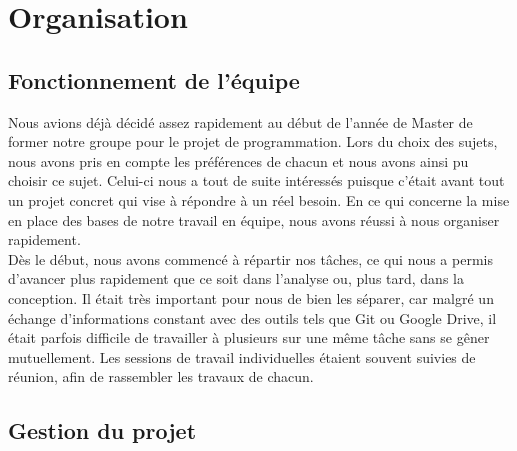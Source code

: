 \documentclass[16pts]{report}
\begin{document}

\nocite{*}

\chapter{Organisation}
\label{cha:Organisation}

\section{Fonctionnement de l'équipe}
\label{sec:Fonctionnement de l'équipe}

Nous avions déjà décidé assez rapidement au début de l'année de Master 
de former notre groupe pour le projet de programmation. Lors du choix 
des sujets, nous avons pris en compte les préférences de chacun et nous 
avons ainsi pu choisir ce sujet. Celui-ci nous a tout de suite intéressés 
puisque c'était avant tout un projet concret qui vise à répondre à un 
réel besoin.
En ce qui concerne la mise en place des bases de notre travail en 
équipe, nous avons réussi à nous organiser rapidement. 
\\
Dès le début, nous avons commencé à répartir nos tâches, ce qui nous a 
permis d’avancer plus rapidement que ce soit dans l’analyse ou, plus tard, 
dans la conception. Il était très important pour nous de bien les séparer, 
car malgré un échange d’informations constant avec des outils tels que 
Git ou Google Drive, il était parfois difficile de travailler à plusieurs 
sur une même tâche sans se gêner mutuellement. Les sessions de travail 
individuelles étaient souvent suivies de réunion, afin de rassembler 
les travaux de chacun.
\\


\section{Gestion du projet}
\label{sec:Gestion du projet}
\end{document}
